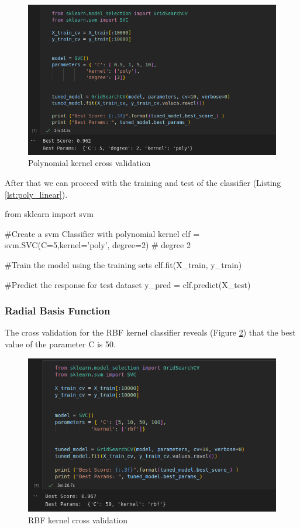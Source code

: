 \documentclass[12pt]{article}
\begin{document}
\begin{figure}[H]
    \centering
    \includegraphics[scale=0.54]{poly_cross.png}
    \caption{Polynomial kernel cross validation}
    \label{fig:poly_cross}
\end{figure}

After that we can proceed with the training and test of the classifier 
(Listing \ref{lst:poly_linear}).

\begin{python}[caption={SVM polynomial kernel},label={lst:poly_linear}]
from sklearn import svm

#Create a svm Classifier with polynomial kernel
clf = svm.SVC(C=5,kernel='poly', degree=2)  # degree 2

#Train the model using the training sets
clf.fit(X_train, y_train)

#Predict the response for test dataset
y_pred = clf.predict(X_test)
\end{python}

\subsubsection{Radial Basis Function}
The cross validation for the RBF kernel classifier reveals (Figure \ref{fig:rbf_cross}) that the best 
value of the parameter C is 50.

\begin{figure}[H]
    \centering
    \includegraphics[scale=0.54]{rbf_cross.png}
    \caption{RBF kernel cross validation}
    \label{fig:rbf_cross}
\end{figure}
\end{document}
